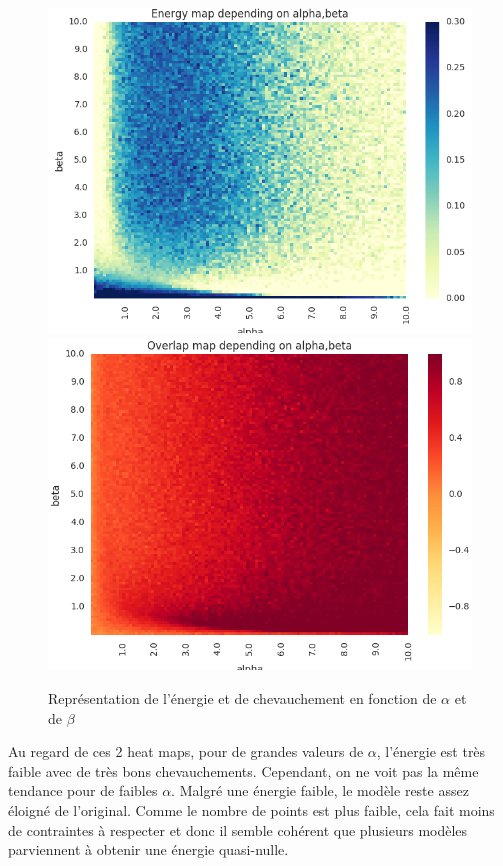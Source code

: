 \documentclass[twocolumn]{article}
\begin{document}
		\begin{figure}
			\includegraphics[width=\columnwidth]{../tobekept/ex2_2323132067031870085-r.png}
			\includegraphics[width=\columnwidth]{../tobekept/ex3_2323132067031870085-r.png}
			\caption{\label{ex2}Représentation de l'énergie et de chevauchement en fonction de $\alpha$ et de $\beta$}
		\end{figure}
		Au regard de ces 2 heat maps, pour de grandes valeurs de $\alpha$, l'énergie est très faible avec de très bons chevauchements. Cependant, on ne voit pas la même tendance pour de faibles $\alpha$. Malgré une énergie faible, le modèle reste assez éloigné de l'original. Comme le nombre de points est plus faible, cela fait moins de contraintes à respecter et donc il semble cohérent que plusieurs modèles parviennent à obtenir une énergie quasi-nulle. 
\end{document}
